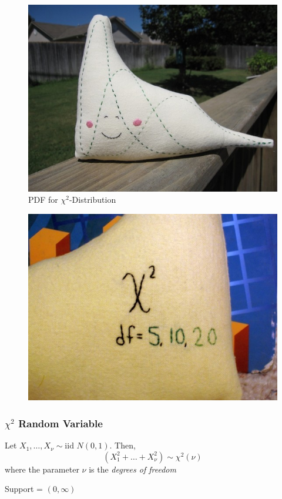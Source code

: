 \documentclass[handout]{beamer}
\begin{document}
\begin{frame}
\begin{figure}
\includegraphics[scale = 0.45]{./images/chisq_etsy1}
\caption{PDF for $\chi^2$-Distribution}
\end{figure}
\end{frame}

\begin{frame}
\begin{figure}
\includegraphics[scale = 0.45]{./images/chisq_etsy2}
\end{figure}
\end{frame}
\begin{frame}
\frametitle{$\chi^2$ Random Variable}
Let $X_1, \hdots, X_\nu \sim \mbox{iid } N(0,1)$. Then,
	$$\left(X_1^2 + \hdots + X_\nu^2  \right)\sim \chi^2(\nu)$$
	where the parameter $\nu$ is the \emph{degrees of freedom}
	
	\vspace{1em}
	\pause
	\alert{Support = $(0, \infty)$}\\
	\vspace{1em}
\end{frame}
\end{document}
